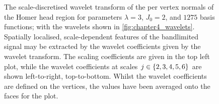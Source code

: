 \begin{figure}[htp]
	\hfill
	\caption{
		The scale-discretised wavelet transform of the per vertex normals of the Homer head region for parameters \(\lambda=3\), \(J_{0}=2\), and \(\num{1275}\) basis functions; \ie{} with the wavelets shown in \cref{fig:chapter4_wavelets}.
		Spatially localised, scale-dependent features of the bandlimited signal may be extracted by the wavelet coefficients given by the wavelet transform.
		The scaling coefficients are given in the top left plot, while the wavelet coefficients at scales \(j \in \{2, 3, 4, 5, 6\}\) are shown left-to-right, top-to-bottom.
		Whilst the wavelet coefficients are defined on the vertices, the values have been averaged onto the faces for the plot.
	}\label{fig:chapter4_wavelet_coefficients}
\end{figure}
